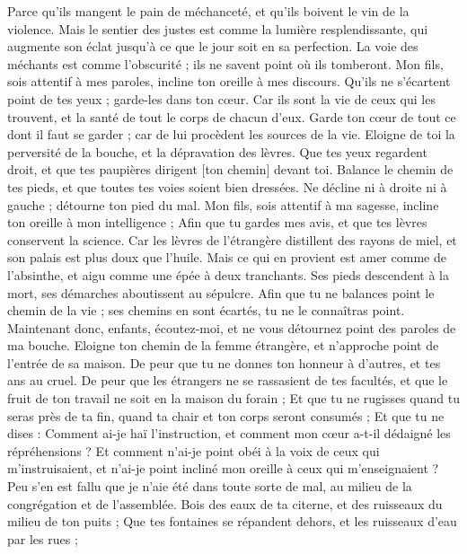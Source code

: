 \begin{multicols}{2}
Parce qu'ils mangent le pain de méchanceté, et qu'ils boivent le vin de la violence.
Mais le sentier des justes est comme la lumière resplendissante, qui augmente son éclat jusqu'à ce que le jour soit en sa perfection.
La voie des méchants est comme l'obscurité ; ils ne savent point où ils tomberont.
Mon fils, sois attentif à mes paroles, incline ton oreille à mes discours.
Qu'ils ne s'écartent point de tes yeux ; garde-les dans ton cœur.
Car ils sont la vie de ceux qui les trouvent, et la santé de tout le corps de chacun d'eux.
Garde ton cœur de tout ce dont il faut se garder ; car de lui procèdent les sources de la vie.
Eloigne de toi la perversité de la bouche, et la dépravation des lèvres.
Que tes yeux regardent droit, et que tes paupières dirigent [ton chemin] devant toi.
Balance le chemin de tes pieds, et que toutes tes voies soient bien dressées.
Ne décline ni à droite ni à gauche ; détourne ton pied du mal.
\VerseOne{}Mon fils, sois attentif à ma sagesse, incline ton oreille à mon intelligence ;
Afin que tu gardes mes avis, et que tes lèvres conservent la science.
Car les lèvres de l'étrangère distillent des rayons de miel, et son palais est plus doux que l'huile.
Mais ce qui en provient est amer comme de l'absinthe, et aigu comme une épée à deux tranchants.
Ses pieds descendent à la mort, ses démarches aboutissent au sépulcre.
Afin que tu ne balances point le chemin de la vie ; ses chemins en sont écartés, tu ne le connaîtras point.
Maintenant donc, enfants, écoutez-moi, et ne vous détournez point des paroles de ma bouche.
Eloigne ton chemin de la femme étrangère, et n'approche point de l'entrée de sa maison.
De peur que tu ne donnes ton honneur à d'autres, et tes ans au cruel.
De peur que les étrangers ne se rassasient de tes facultés, et que le fruit de ton travail ne soit en la maison du forain ;
Et que tu ne rugisses quand tu seras près de ta fin, quand ta chair et ton corps seront consumés ;
Et que tu ne dises : Comment ai-je haï l'instruction, et comment mon cœur a-t-il dédaigné les répréhensions ?
Et comment n'ai-je point obéi à la voix de ceux qui m'instruisaient, et n'ai-je point incliné mon oreille à ceux qui m'enseignaient ?
Peu s'en est fallu que je n'aie été dans toute sorte de mal, au milieu de la congrégation et de l'assemblée.
Bois des eaux de ta citerne, et des ruisseaux du milieu de ton puits ;
Que tes fontaines se répandent dehors, et les ruisseaux d'eau par les rues ;

\end{multicols}
